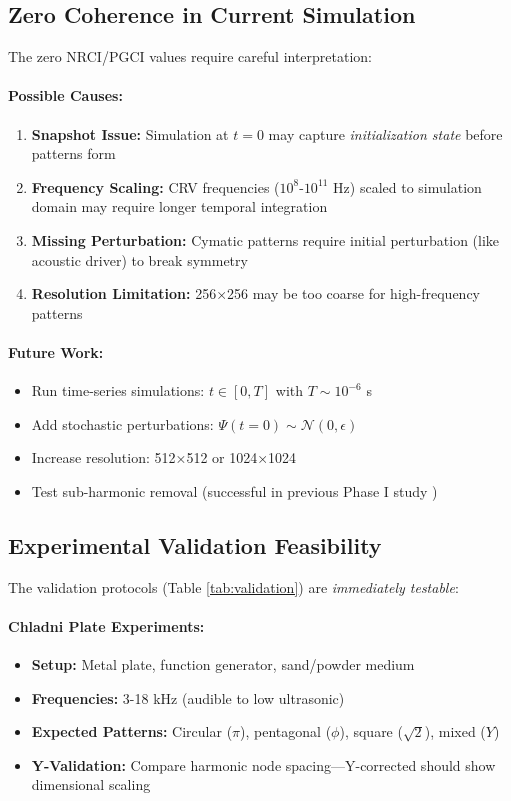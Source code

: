 \documentclass[11pt,a4paper]{article}
\begin{document}
\subsection{Zero Coherence in Current Simulation}

The zero NRCI/PGCI values require careful interpretation:

\paragraph{Possible Causes:}
\begin{enumerate}
    \item \textbf{Snapshot Issue:} Simulation at $t=0$ may capture \emph{initialization state} before patterns form
    \item \textbf{Frequency Scaling:} CRV frequencies ($10^8$-$10^{11}$ Hz) scaled to simulation domain may require longer temporal integration
    \item \textbf{Missing Perturbation:} Cymatic patterns require initial perturbation (like acoustic driver) to break symmetry
    \item \textbf{Resolution Limitation:} 256×256 may be too coarse for high-frequency patterns
\end{enumerate}

\paragraph{Future Work:}
\begin{itemize}
    \item Run time-series simulations: $t \in [0, T]$ with $T \sim 10^{-6}$ s
    \item Add stochastic perturbations: $\Psi(t=0) \sim \mathcal{N}(0, \epsilon)$
    \item Increase resolution: 512×512 or 1024×1024
    \item Test sub-harmonic removal (successful in previous Phase I study \cite{ubp_focc})
\end{itemize}

\subsection{Experimental Validation Feasibility}

The validation protocols (Table \ref{tab:validation}) are \emph{immediately testable}:

\paragraph{Chladni Plate Experiments:}
\begin{itemize}
    \item \textbf{Setup:} Metal plate, function generator, sand/powder medium
    \item \textbf{Frequencies:} 3-18 kHz (audible to low ultrasonic)
    \item \textbf{Expected Patterns:} Circular ($\pi$), pentagonal ($\phi$), square ($\sqrt{2}$), mixed ($Y$)
    \item \textbf{Y-Validation:} Compare harmonic node spacing---Y-corrected should show dimensional scaling
\end{itemize}
\end{document}

